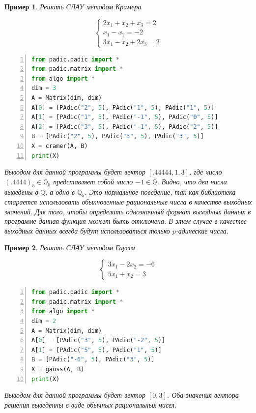 \documentclass[master, och, diploma, times]{sty/SCWorks}
\theoremstyle{plain}
\newtheorem{exmp}{Пример}[section]
\theoremstyle{definition}
\numberwithin{equation}{section}
\begin{document}
\begin{exmp}
Решить СЛАУ методом Крамера

$$
\begin{cases} 
  2x_1 + x_2 + x_3 = 2 \\
  x_1 - x_2 = -2 \\
  3x_1 - x_2 +2x_3 =2
\end{cases} 
$$

\begin{lstlisting}[language=Python, numbers=left, showstringspaces=false, breaklines=true, basicstyle=\small]
from padic.padic import *
from padic.matrix import *
from algo import *
dim = 3
A = Matrix(dim, dim)
A[0] = [PAdic("2", 5), PAdic("1", 5), PAdic("1", 5)]
A[1] = [PAdic("1", 5), PAdic("-1", 5), PAdic("0", 5)]
A[2] = [PAdic("3", 5), PAdic("-1", 5), PAdic("2", 5)]
B = [PAdic("2", 5), PAdic("3", 5), PAdic("3", 5)]
X = cramer(A, B)
print(X)
\end{lstlisting}

\noindent Выводом для данной программы будет вектор $[.44444, 1, 3]$, где число $(.4444)_5 \in \mathbb{Q}_5$ представляет собой число $-1 \in \mathbb{Q}$. Видно, что два числа выведены в $\mathbb{Q}$, а одно в $\mathbb{Q}_5$. Это нормальное поведение, так как библиотека старается использовать обыкновенные рациональные числа в качестве выходных значений. Для того, чтобы определить однозначный формат выходных данных в программе данная функция может быть отключена. В этом случае в качестве выходных данных всегда будут использоваться только $p$-адические числа.
\end{exmp}

\begin{exmp}
Решить СЛАУ методом Гаусса

$$
\begin{cases} 
  3x_1 - 2x_2 = -6 \\
  5x_1 + x_2 = 3
\end{cases} 
$$

\begin{lstlisting}[language=Python, numbers=left, showstringspaces=false, breaklines=true, basicstyle=\small]
from padic.padic import *
from padic.matrix import *
from algo import *
dim = 2
A = Matrix(dim, dim)
A[0] = [PAdic("3", 5), PAdic("-2", 5)]
A[1] = [PAdic("5", 5), PAdic("1", 5)]
B = [PAdic("-6", 5), PAdic("3", 5)]
X = gauss(A, B)
print(X)
\end{lstlisting}

\noindent Выводом для данной программы будет вектор $[0, 3]$. Оба значения вектора решения выведенны в виде обычных рациональных чисел.
\end{exmp}
\end{document}
